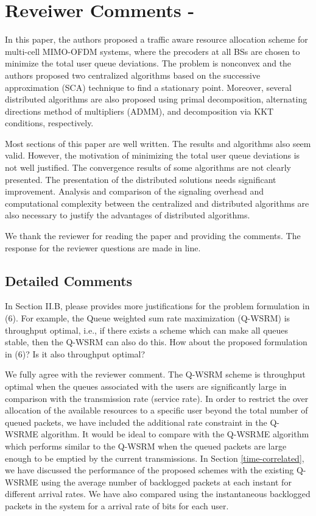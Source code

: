 
\section*{Reveiwer Comments - }

In this paper, the authors proposed a traffic aware resource allocation scheme for multi-cell MIMO-OFDM systems, where the precoders at all BSs are chosen to minimize the total user queue deviations. The problem is nonconvex and the authors proposed two centralized algorithms based on the successive approximation (SCA) technique to find a stationary point. Moreover, several distributed algorithms are also proposed using primal decomposition, alternating directions method of multipliers (ADMM), and decomposition via KKT conditions, respectively.

Most sections of this paper are well written. The results and algorithms also seem valid. However, the motivation of minimizing the total user queue deviations is not well justified. The convergence results of some algorithms are not clearly presented. The presentation of the distributed solutions needs significant improvement. Analysis and comparison of the signaling overhead and computational complexity between the centralized and distributed algorithms are also necessary to justify the advantages of distributed algorithms.

\resp We thank the reviewer for reading the paper and providing the comments. The response for the reviewer questions are made in line.

\subsection*{Detailed Comments}  
 In Section II.B, please provides more justifications for the problem formulation in (6). For example, the Queue weighted sum rate maximization (Q-WSRM) is throughput optimal, i.e., if there exists a scheme which can make all queues stable, then the Q-WSRM can also do this. How about the proposed formulation in (6)? Is it also throughput optimal? 

\resp We fully agree with the reviewer comment. The Q-WSRM scheme is throughput optimal when the queues associated with the users are significantly large in comparison with the transmission rate (service rate). In order to restrict the over allocation of the available resources to a specific user beyond the total number of queued packets, we have included the additional rate constraint in the Q-WSRME algorithm. It would be ideal to compare with the Q-WSRME algorithm which performs similar to the Q-WSRM when the queued packets are large enough to be emptied by the current transmissions. In Section \ref{time-correlated}, we have discussed the performance of the proposed schemes with the existing \ac{Q-WSRME} using the average number of backlogged packets at each instant for different arrival rates. We have also compared using the instantaneous backlogged packets in the system for a arrival rate of  bits for each user.

